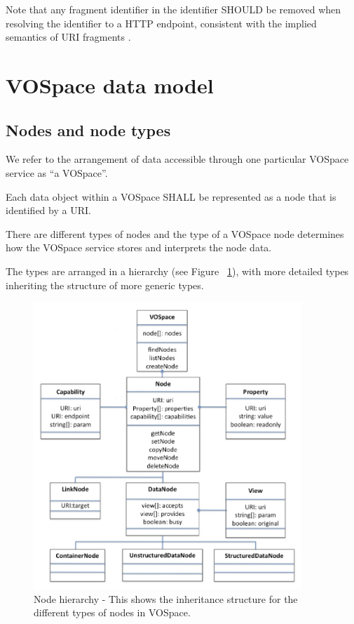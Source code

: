 \documentclass[11pt,a4paper]{ivoa}
\begin{document}
Note that any fragment identifier in the identifier SHOULD be removed when resolving the identifier to a HTTP endpoint, consistent with the implied semantics of URI fragments \citep{note:uriforms}.

\section{VOSpace data model}
\label{sec:vospace data model}

\subsection{Nodes and node types}
\label{subsec:nodes and node types}

We refer to the arrangement of data accessible through one particular VOSpace service as ``a VOSpace''.

Each data object within a VOSpace SHALL be represented as a node that is identified by a URI.

There are different types of nodes and the type of a VOSpace node determines how the VOSpace service stores and interprets the node data.

The types are arranged in a hierarchy (see Figure ~\ref{fig:nodehierarchy}), with more detailed types inheriting the structure of more generic types.

\begin{figure}
\centering
\includegraphics[width=0.9\textwidth]{vospace-node-hierarchy.png}
\caption{Node hierarchy - This shows the inheritance structure for the different types of nodes in VOSpace.}
\label{fig:nodehierarchy}
\end{figure}
\end{document}
